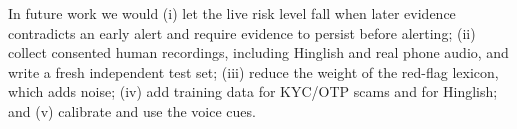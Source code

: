 \documentclass[letterpaper,12pt]{article}
\begin{document}
In future work we would (i) let the live risk level fall when later evidence contradicts an early alert and require evidence to persist before alerting; (ii) collect consented human recordings, including Hinglish and real phone audio, and write a fresh independent test set; (iii) reduce the weight of the red-flag lexicon, which adds noise; (iv) add training data for KYC/OTP scams and for Hinglish; and (v) calibrate and use the voice cues.



\end{document}
